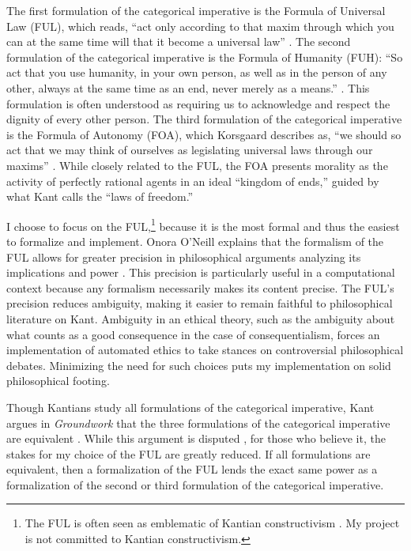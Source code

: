 \begin{isabellebody}
\begin{isamarkuptext}
The first formulation of the categorical imperative is the
Formula of Universal Law (FUL), which reads, ``act only according to that maxim through which you can 
at the same time will that it become a universal law'' \citep[34]{groundwork}. The 
second formulation of the categorical imperative is the Formula of Humanity (FUH): ``So act that you use humanity, 
in your own person, as well as in the person of any other, always at the same time as an end, never merely 
as a means.'' \cite[41]{groundwork}. This formulation is often understood as requiring us to 
acknowledge and respect the dignity of every other person. The third formulation of the categorical 
imperative is the Formula of Autonomy (FOA), which Korsgaard describes
as, ``we should so act that we may think of ourselves as legislating universal laws through our 
maxims'' \cite[28]{korsgaardintro}. While closely related to the FUL, the FOA presents morality as the activity of 
perfectly rational agents in an ideal ``kingdom of ends,'' guided by what Kant calls the ``laws of freedom.''

I choose to focus on the FUL,\footnote{The FUL is often seen as emblematic of Kantian constructivism \cite[173]{ebelsduggan}. 
My project is not committed to Kantian constructivism.} because it is the most formal and thus the 
easiest to formalize and implement. Onora O'Neill explains that the formalism of the FUL allows 
for greater precision in philosophical arguments analyzing its implications and power \cite[33]{actingonprinciple}. This precision 
is particularly useful in a computational context because any formalism necessarily makes its content 
precise. The FUL's precision reduces ambiguity, making it easier to remain faithful to philosophical
literature on Kant. Ambiguity in an ethical theory, such as the ambiguity about what counts as a good consequence
in the case of consequentialism, forces an implementation of automated ethics to take stances on controversial
philosophical debates. Minimizing the need for such choices puts my implementation on solid philosophical footing.

Though Kantians study all formulations of the categorical imperative, Kant argues in \emph{Groundwork} 
that the three formulations of the categorical imperative are equivalent \citep{groundwork}. While this 
argument is disputed \citep{sepkant}, for those who believe it, the
stakes for my choice of the FUL are greatly reduced. If all formulations are equivalent, then a formalization of the FUL
lends the exact same power as a formalization of the second or third formulation of the categorical 
imperative. 


\end{isamarkuptext}
\end{isabellebody}
